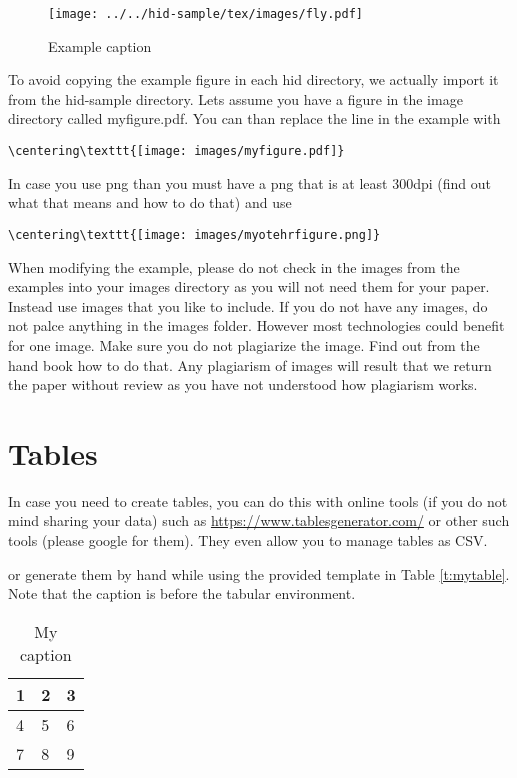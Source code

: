 \begin{figure}[!ht]
  \centering\texttt{[image: ../../hid-sample/tex/images/fly.pdf]}
  \caption{Example caption}\label{f:fly}
\end{figure}

To avoid copying the example figure in each hid directory, we actually
import it from the hid-sample directory. Lets assume you have a figure
in the image directory called myfigure.pdf. You can than replace the
line in the example with

\begin{verbatim}
\centering\texttt{[image: images/myfigure.pdf]}
\end{verbatim}

In case you use png than you must have a png that is at least 300dpi
(find out what that means and how to do that) and use 

\begin{verbatim}
\centering\texttt{[image: images/myotehrfigure.png]}
\end{verbatim}

When modifying the example, please do not check in the images from the
examples into your images directory as you will not need them for your
paper. Instead use images that you like to include. If you do not have
any images, do not palce anything in the images folder. However most
technologies could benefit for one image. Make sure you do not
plagiarize the image. Find out from the hand book how to do that. Any
plagiarism of images will result that we return the paper without
review as you have not understood how plagiarism works.

\section{Tables}

In case you need to create tables, you can do this with online tools
(if you do not mind sharing your data) such as
\url{https://www.tablesgenerator.com/} or other such tools (please
google for them). They even allow you to manage tables as CSV.

or generate them by hand while using the provided template in Table
\ref{t:mytable}. Note that
the caption is before the tabular environment.

\begin{table}[htb]
\centering
\caption{My caption}
\label{t:mytabble}
\begin{tabular}{lll}
1 & 2 & 3 \\
\toprule
4 & 5 & 6 \\
7 & 8 & 9
\end{tabular}
\end{table}

